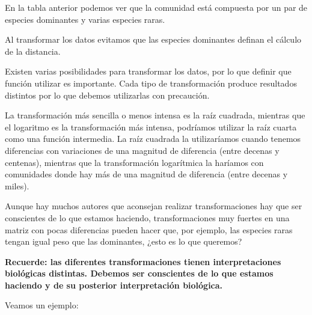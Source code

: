 \documentclass[
]{article}
\begin{document}
En la tabla anterior podemos ver que la comunidad está compuesta por un par de especies dominantes y varias especies raras.

Al transformar los datos evitamos que las especies dominantes definan el cálculo de la distancia.

Existen varias posibilidades para transformar los datos, por lo que definir que función utilizar es importante. Cada tipo de transformación produce resultados distintos por lo que debemos utilizarlas con precaución.

La transformación más sencilla o menos intensa es la raíz cuadrada, mientras que el logaritmo es la transformación más intensa, podríamos utilizar la raíz cuarta como una función intermedia. La raíz cuadrada la utilizaríamos cuando tenemos diferencias con variaciones de una magnitud de diferencia (entre decenas y centenas), mientras que la transformación logarítmica la haríamos con comunidades donde hay más de una magnitud de diferencia (entre decenas y miles).

Aunque hay muchos autores que aconsejan realizar transformaciones hay que ser conscientes de lo que estamos haciendo, transformaciones muy fuertes en una matriz con pocas diferencias pueden hacer que, por ejemplo, las especies raras tengan igual peso que las dominantes, ¿esto es lo que queremos?

\textbf{Recuerde: las diferentes transformaciones tienen interpretaciones biológicas distintas. Debemos ser conscientes de lo que estamos haciendo y de su posterior interpretación biológica.}

Veamos un ejemplo:
\end{document}
